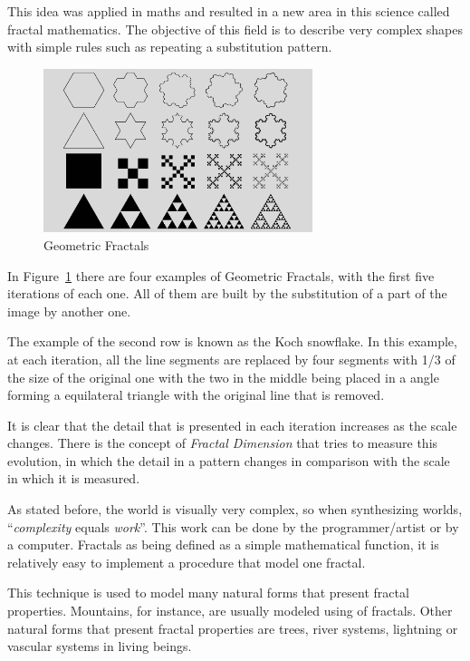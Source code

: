 This idea was applied in maths and resulted in a new area in this science called fractal mathematics. The objective of this field is to describe very complex shapes with simple rules such as repeating a substitution pattern. 

\begin{figure}[htbp]
	\centering
	\includegraphics[width=0.7\textwidth]{img/Theory/Fractals/Fractal1_1000.png}
	\caption{Geometric Fractals}
	\label{fig:GFractals}
\end{figure}

In Figure~\ref{fig:GFractals} there are four examples of Geometric Fractals, with the first five iterations of each one. All of them are built by the substitution of a part of the image by another one. 

The example of the second row is known as the Koch snowflake. In this example, at each iteration, all the line segments are replaced by four segments with 1/3 of the size of the original one with the two in the middle being placed in a angle forming a equilateral triangle with the original line that is removed.

It is clear that the detail that is presented in each iteration increases as the scale changes. There is the concept of \emph{Fractal Dimension} that tries to measure this evolution, in which the detail in a pattern changes in comparison with the scale in which it is measured.

As stated before, the world is visually very complex, so when synthesizing worlds, ``\emph{complexity} equals \emph{work}''\cite{Ebert2002}. This work can be done by the programmer/artist or by a computer. Fractals as being defined as a simple mathematical function, it is relatively easy to implement a procedure that model one fractal. 

This technique is used to model many natural forms that present fractal properties. Mountains, for instance, are usually modeled using of fractals. Other natural forms that present fractal properties are trees, river systems, lightning or vascular systems in living beings.




